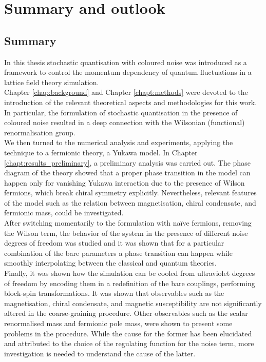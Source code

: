 
\chapter{Summary and outlook}
\label{chap:conclusions}
\section*{Summary}
In this thesis stochastic quantisation with coloured noise was introduced as a framework to control the momentum dependency of quantum fluctuations in a lattice field theory simulation. \\
Chapter \ref{chap:background} and Chapter \ref{chapt:methods} were devoted to the introduction of the relevant theoretical aspects and methodologies for this work. In particular, the formulation 
of stochastic quantisation in the presence of coloured noise resulted in a deep connection with the Wilsonian (functional) renormalisation group. \\
We then turned to the numerical analysis and experiments, applying the technique to a fermionic theory, a Yukawa model. In Chapter \ref{chapt:results_preliminary}, a preliminary analysis was carried out. The phase diagram of the theory showed that a proper phase transition in the model can happen only for vanishing Yukawa interaction due to the presence of Wilson 
fermions, which break chiral symmetry explicitly. Nevertheless, relevant features of the model such as the relation between magnetisation, chiral condensate, and fermionic mass, could be investigated. \\
After switching momentarily to the formulation with na\"ive fermions, removing the Wilson term, the behavior of the system in the presence of different noise degrees of freedom was studied and it was shown that for a particular combination of the bare parameters
a phase transition can happen while smoothly interpolating between the classical and quantum theories. \\
Finally, it was shown how the simulation can be cooled from ultraviolet degrees of freedom by encoding them in a redefinition of the bare couplings, performing block-spin transformations. It was shown that observables such as the magnetisation, chiral condensate, and magnetic susceptibility are not significantly altered in the coarse-graining procedure.
Other observables such as the scalar renormalised mass and fermionic pole mass, were shown to present some problems in the procedure. While the cause for the former has been elucidated and attributed to the choice of the regulating function for the noise term, more investigation is needed to understand the cause of the latter. 
\newpage 

